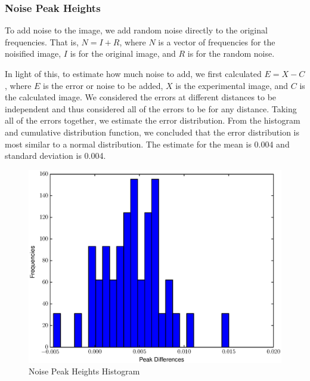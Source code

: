 \documentclass[12pt,letterpaper]{article}
\begin{document}
\subsubsection{Noise Peak Heights}
To add noise to the image, we add random noise directly to the original
frequencies.  That is, $N = I + R$, where $N$ is a vector of frequencies for the
noisified image, $I$ is for the original image, and $R$ is for the random noise.

In light of this, to estimate how much noise to add, we first calculated $E = X -
C$, where $E$ is the error or noise to be added, $X$ is the experimental image,
and $C$ is the calculated image. We considered the errors at different distances
to be independent and thus considered all of the errors to be for any distance.
Taking all of the errors together, we estimate the error distribution. From the
histogram and cumulative distribution function, we concluded that the error
distribution is most similar to a normal distribution. The estimate for the mean
is 0.004 and standard deviation is 0.004.

\begin{figure}[ht]
  \begin{center}
    \includegraphics[scale=0.8]{figs/noise_peak_dist.eps}
    \caption{Noise Peak Heights Histogram}
  \end{center}
\end{figure}
\end{document}
